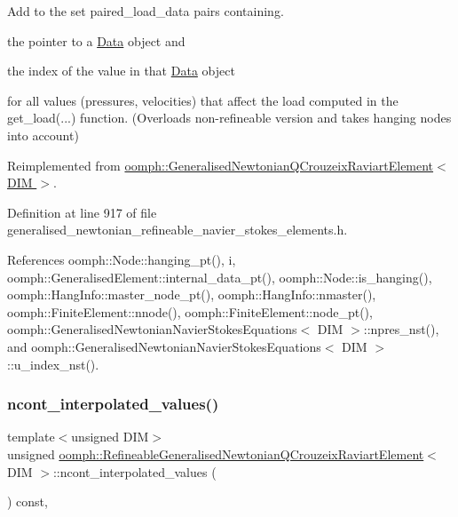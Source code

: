 Add to the set {\ttfamily paired\+\_\+load\+\_\+data} pairs containing. 


\begin{DoxyItemize}
\item the pointer to a \hyperlink{classoomph_1_1Data}{Data} object and
\item the index of the value in that \hyperlink{classoomph_1_1Data}{Data} object
\end{DoxyItemize}for all values (pressures, velocities) that affect the load computed in the {\ttfamily get\+\_\+load}(...) function. (Overloads non-\/refineable version and takes hanging nodes into account) 

Reimplemented from \hyperlink{classoomph_1_1GeneralisedNewtonianQCrouzeixRaviartElement_a49a4adf55b10a9aab75f864597e892cd}{oomph\+::\+Generalised\+Newtonian\+Q\+Crouzeix\+Raviart\+Element$<$ D\+I\+M $>$}.



Definition at line 917 of file generalised\+\_\+newtonian\+\_\+refineable\+\_\+navier\+\_\+stokes\+\_\+elements.\+h.



References oomph\+::\+Node\+::hanging\+\_\+pt(), i, oomph\+::\+Generalised\+Element\+::internal\+\_\+data\+\_\+pt(), oomph\+::\+Node\+::is\+\_\+hanging(), oomph\+::\+Hang\+Info\+::master\+\_\+node\+\_\+pt(), oomph\+::\+Hang\+Info\+::nmaster(), oomph\+::\+Finite\+Element\+::nnode(), oomph\+::\+Finite\+Element\+::node\+\_\+pt(), oomph\+::\+Generalised\+Newtonian\+Navier\+Stokes\+Equations$<$ D\+I\+M $>$\+::npres\+\_\+nst(), and oomph\+::\+Generalised\+Newtonian\+Navier\+Stokes\+Equations$<$ D\+I\+M $>$\+::u\+\_\+index\+\_\+nst().

\mbox{\label{classoomph_1_1RefineableGeneralisedNewtonianQCrouzeixRaviartElement_aae8a005fdf9c488de07313101792164b}} 
\subsubsection{\texorpdfstring{ncont\+\_\+interpolated\+\_\+values()}{ncont\_interpolated\_values()}}
{\footnotesize\ttfamily template$<$unsigned D\+IM$>$ \\
unsigned \hyperlink{classoomph_1_1RefineableGeneralisedNewtonianQCrouzeixRaviartElement}{oomph\+::\+Refineable\+Generalised\+Newtonian\+Q\+Crouzeix\+Raviart\+Element}$<$ D\+IM $>$\+::ncont\+\_\+interpolated\+\_\+values (\begin{DoxyParamCaption}{ }\end{DoxyParamCaption}) const\hspace{0.3cm}{\ttfamily [inline]}, {\ttfamily [virtual]}}



